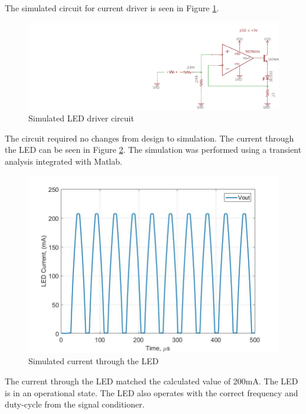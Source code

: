 The simulated circuit for current driver is seen in Figure \ref{fig:finalleddriverschem}.

\begin{figure}
	\centering
	\includegraphics[width=0.7\linewidth]{CircuitDevelopment/FinalLEDdriverSChem}
	\caption[Simulated LED driver]{Simulated LED driver circuit}
	\label{fig:finalleddriverschem}
\end{figure}

The circuit required no changes from design to simulation. The current through the LED can be seen in Figure \ref{fig:simcurrentlab4}. The simulation was performed using a transient analysis integrated with Matlab.

\begin{figure}
	\centering
	\includegraphics[width=0.7\linewidth]{CircuitDevelopment/sim_current_lab4}
	\caption[Simulated current]{Simulated current through the LED}
	\label{fig:simcurrentlab4}
\end{figure}

The current through the LED matched the calculated value of 200mA. The LED is in an operational state. The LED also operates with the correct frequency and duty-cycle from the signal conditioner.



